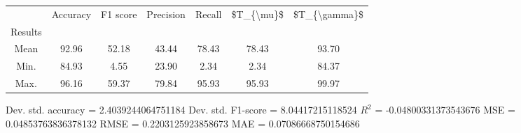 \begin{tabular}{|c|c|c|c|c|c|c|}
\toprule
{} &  Accuracy &  F1 score &  Precision &  Recall &  \$T\_\{\textbackslash mu\}\$ &  \$T\_\{\textbackslash gamma\}\$ \\
Results &           &           &            &         &            &               \\
\hline
Mean    &     92.96 &     52.18 &      43.44 &   78.43 &      78.43 &         93.70 \\
Min.    &     84.93 &      4.55 &      23.90 &    2.34 &       2.34 &         84.37 \\
Max.    &     96.16 &     59.37 &      79.84 &   95.93 &      95.93 &         99.97 \\
\bottomrule
\end{tabular}

 Dev. std. accuracy = 2.4039244064751184
 Dev. std. F1-score = 8.04417215118524
 $R^2$ = -0.04800331373543676
 MSE = 0.04853763836378132
 RMSE = 0.2203125923858673
 MAE = 0.07086668750154686